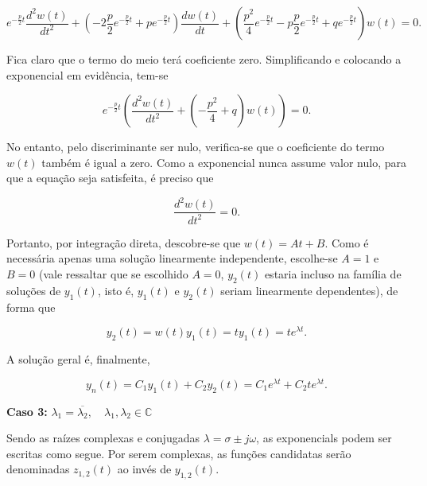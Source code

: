 \documentclass{article}
\numberwithin{equation}{section}
\let\l\left
\let\r\right
\let\dfr\dfrac
\newcommand{\itembull}[1]{\noindent\textbf{\small{\textbullet \hspace{1.5mm}#1}}}
\begin{document}
\begin{equation*}
    e^{-\frac{p}{2}t}\frac{d^2w(t)}{dt^2} + \l(-2\dfr{p}{2}e^{-\frac{p}{2}t} + pe^{-\frac{p}{2}t}\r)\dfr{dw(t)}{dt} + \l(\dfr{p^2}{4}e^{-\frac{p}{2}t}-p\dfr{p}{2}e^{-\frac{p}{2}t}+qe^{-\frac{p}{2}t} \r)w(t) = 0.
\end{equation*}

\noindent Fica claro que o termo do meio terá coeficiente zero. Simplificando e colocando a exponencial em evidência, tem-se

\begin{equation*}
    e^{-\frac{p}{2}t}\l(\dfr{d^2w(t)}{dt^2}+\l(-\dfr{p^2}{4}+q\r)w(t)\r) = 0.
\end{equation*}

\noindent No entanto, pelo discriminante ser nulo, verifica-se que o coeficiente do termo $w(t)$ também é igual a zero. Como a exponencial nunca assume valor nulo, para que a equação seja satisfeita, é preciso que

\begin{equation}
    \dfr{d^2w(t)}{dt^2} = 0. \label{eq:dalembert_3}
\end{equation}

\noindent Portanto, por integração direta, descobre-se que $w(t)=At+B$. Como é necessária apenas uma solução linearmente independente, escolhe-se $A=1$ e $B=0$ (vale ressaltar que se escolhido $A=0$, $y_2(t)$ estaria incluso na família de soluções de $y_1(t)$, isto é, $y_1(t)$ e $y_2(t)$ seriam linearmente dependentes), de forma que

\begin{equation*}
    y_2(t) = w(t)y_1(t) = ty_1(t) = te^{\lambda t}.
\end{equation*}

\noindent A solução geral é, finalmente,

\begin{equation}
    y_n(t) = C_1y_1(t)+C_2y_2(t) = C_1e^{\lambda t}+C_2te^{\lambda t}.
\end{equation}

\vspace{3mm}

\itembull{Caso 3:} $\lambda_{1} = \overline{\lambda_{2}}, \quad \lambda_{1},\lambda_{2} \in \mathbb{C}$

Sendo as raízes complexas e conjugadas $\lambda = \sigma \pm j\omega$, as exponencials podem ser escritas como segue. Por serem complexas, as funções candidatas serão denominadas $z_{1,2}(t)$ ao invés de $y_{1,2}(t)$.
\end{document}
